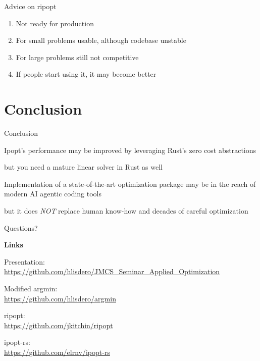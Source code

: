 \documentclass{beamer}
\begin{document}
\begin{frame}{Advice on ripopt}

  \begin{enumerate}
    \item Not ready for production
    \item For small problems usable, although codebase unstable
    \item For large problems still not competitive
    \item If people start using it, it may become better
  \end{enumerate}

\end{frame}

\section{Conclusion}

\begin{frame}{Conclusion}

  Ipopt's performance may be improved by leveraging Rust's zero cost abstractions

  \begin{flushright}
    \scriptsize but you need a mature linear solver in Rust as well
  \end{flushright}

  \vfill

  Implementation of a state-of-the-art optimization package may be in the reach of modern AI agentic coding tools

  \begin{flushright}
    \scriptsize but it does \emph{NOT} replace human know-how and decades of careful optimization
  \end{flushright}

\end{frame}

\begin{frame}{Questions?}

  \textbf{Links}

  \scriptsize

  \vfill
  Presentation: \\
  \url{https://github.com/hlisdero/JMCS_Seminar_Applied_Optimization}

  \vfill
  Modified argmin: \\
  \url{https://github.com/hlisdero/argmin}

  \vfill
  ripopt: \\
  \url{https://github.com/jkitchin/ripopt}

  \vfill
  ipopt-rs: \\
  \url{https://github.com/elrnv/ipopt-rs}
\end{frame}
\end{document}
